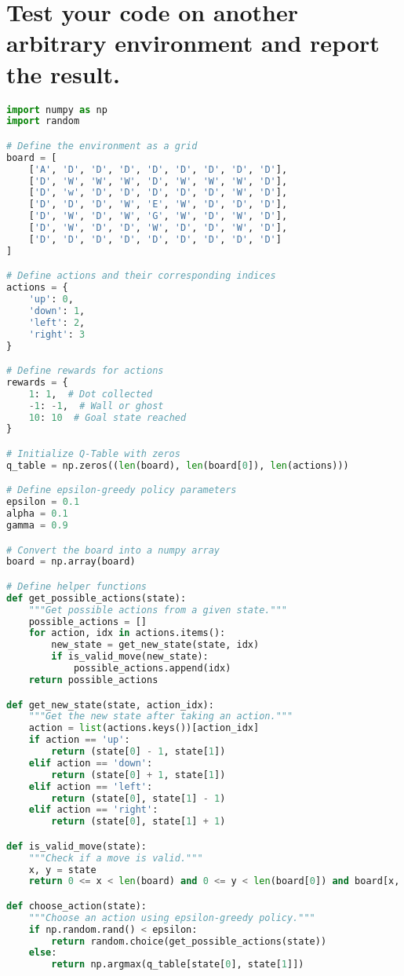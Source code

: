 \documentclass[12pt,onecolumn,a4paper]{article}
\begin{document}
\section{Test your code on another arbitrary environment and report the result.}
\begin{lstlisting}[language=Python]
import numpy as np
import random

# Define the environment as a grid
board = [
    ['A', 'D', 'D', 'D', 'D', 'D', 'D', 'D', 'D'],
    ['D', 'W', 'W', 'W', 'D', 'W', 'W', 'W', 'D'],
    ['D', 'w', 'D', 'D', 'D', 'D', 'D', 'W', 'D'],
    ['D', 'D', 'D', 'W', 'E', 'W', 'D', 'D', 'D'],
    ['D', 'W', 'D', 'W', 'G', 'W', 'D', 'W', 'D'],
    ['D', 'W', 'D', 'D', 'W', 'D', 'D', 'W', 'D'],
    ['D', 'D', 'D', 'D', 'D', 'D', 'D', 'D', 'D']
]

# Define actions and their corresponding indices
actions = {
    'up': 0,
    'down': 1,
    'left': 2,
    'right': 3
}

# Define rewards for actions
rewards = {
    1: 1,  # Dot collected
    -1: -1,  # Wall or ghost
    10: 10  # Goal state reached
}

# Initialize Q-Table with zeros
q_table = np.zeros((len(board), len(board[0]), len(actions)))

# Define epsilon-greedy policy parameters
epsilon = 0.1
alpha = 0.1
gamma = 0.9

# Convert the board into a numpy array
board = np.array(board)

# Define helper functions
def get_possible_actions(state):
    """Get possible actions from a given state."""
    possible_actions = []
    for action, idx in actions.items():
        new_state = get_new_state(state, idx)
        if is_valid_move(new_state):
            possible_actions.append(idx)
    return possible_actions

def get_new_state(state, action_idx):
    """Get the new state after taking an action."""
    action = list(actions.keys())[action_idx]
    if action == 'up':
        return (state[0] - 1, state[1])
    elif action == 'down':
        return (state[0] + 1, state[1])
    elif action == 'left':
        return (state[0], state[1] - 1)
    elif action == 'right':
        return (state[0], state[1] + 1)

def is_valid_move(state):
    """Check if a move is valid."""
    x, y = state
    return 0 <= x < len(board) and 0 <= y < len(board[0]) and board[x, y] != 'W'

def choose_action(state):
    """Choose an action using epsilon-greedy policy."""
    if np.random.rand() < epsilon:
        return random.choice(get_possible_actions(state))
    else:
        return np.argmax(q_table[state[0], state[1]])


\end{lstlisting}
\end{document}
